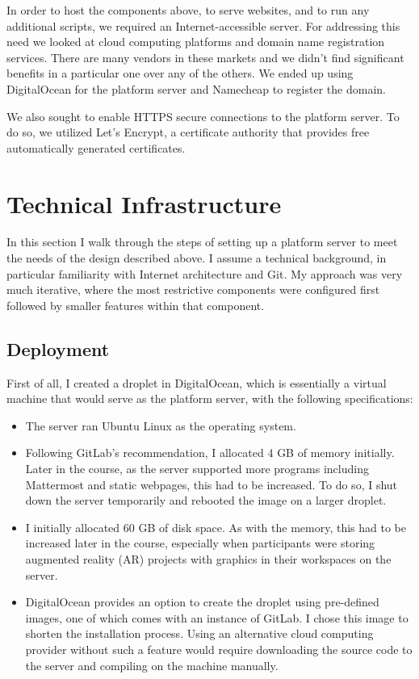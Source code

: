 \documentclass[12pt,twoside]{mitthesis}
\begin{document}
In order to host the components above, to serve websites, and to run any additional scripts, we required an Internet-accessible server. For addressing this need we looked at cloud computing platforms and domain name registration services. There are many vendors in these markets and we didn't find significant benefits in a particular one over any of the others. We ended up using DigitalOcean for the platform server and Namecheap to register the domain.

We also sought to enable HTTPS secure connections to the platform server. To do so, we utilized Let's Encrypt, a certificate authority that provides free automatically generated certificates.

\section{Technical Infrastructure}

In this section I walk through the steps of setting up a platform server to meet the needs of the design described above. I assume a technical background, in particular familiarity with Internet architecture and Git. My approach was very much iterative, where the most restrictive components were configured first followed by smaller features within that component.

\subsection{Deployment}

First of all, I created a droplet in DigitalOcean, which is essentially a virtual machine that would serve as the platform server, with the following specifications:
\begin{itemize}
	\item The server ran Ubuntu Linux as the operating system.
	\item Following GitLab's recommendation, I allocated 4 GB of memory initially. Later in the course, as the server supported more programs including Mattermost and static webpages, this had to be increased. To do so, I shut down the server temporarily and rebooted the image on a larger droplet.
	\item I initially allocated 60 GB of disk space. As with the memory, this had to be increased later in the course, especially when participants were storing augmented reality (AR) projects with graphics in their workspaces on the server.
	\item DigitalOcean provides an option to create the droplet using pre-defined images, one of which comes with an instance of GitLab. I chose this image to shorten the installation process. Using an alternative cloud computing provider without such a feature would require downloading the source code to the server and compiling on the machine manually.
\end{itemize}
\end{document}
